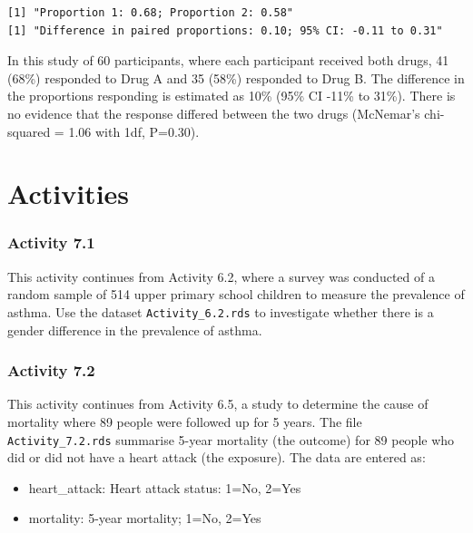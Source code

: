 \documentclass[
  a4paper,
]{memoir}
\providecommand{\tightlist}{%
  \setlength{\itemsep}{0pt}\setlength{\parskip}{0pt}}
\begin{document}
\begin{verbatim}
[1] "Proportion 1: 0.68; Proportion 2: 0.58"
[1] "Difference in paired proportions: 0.10; 95% CI: -0.11 to 0.31"
\end{verbatim}

In this study of 60 participants, where each participant received both
drugs, 41 (68\%) responded to Drug A and 35 (58\%) responded to Drug B.
The difference in the proportions responding is estimated as 10\% (95\%
CI -11\% to 31\%). There is no evidence that the response differed
between the two drugs (McNemar's chi-squared = 1.06 with 1df, P=0.30).

\newpage{}


\chapter*{Activities}\label{activities-6}


\subsection*{Activity 7.1}\label{activity-7.1}

This activity continues from Activity 6.2, where a survey was conducted
of a random sample of 514 upper primary school children to measure the
prevalence of asthma. Use the dataset \texttt{Activity\_6.2.rds} to
investigate whether there is a gender difference in the prevalence of
asthma.

\subsection*{Activity 7.2}\label{activity-7.2}

This activity continues from Activity 6.5, a study to determine the
cause of mortality where 89 people were followed up for 5 years. The
file \texttt{Activity\_7.2.rds} summarise 5-year mortality (the outcome)
for 89 people who did or did not have a heart attack (the exposure). The
data are entered as:

\begin{itemize}
\tightlist
\item
  heart\_attack: Heart attack status: 1=No, 2=Yes
\item
  mortality: 5-year mortality; 1=No, 2=Yes
\end{itemize}
\end{document}
